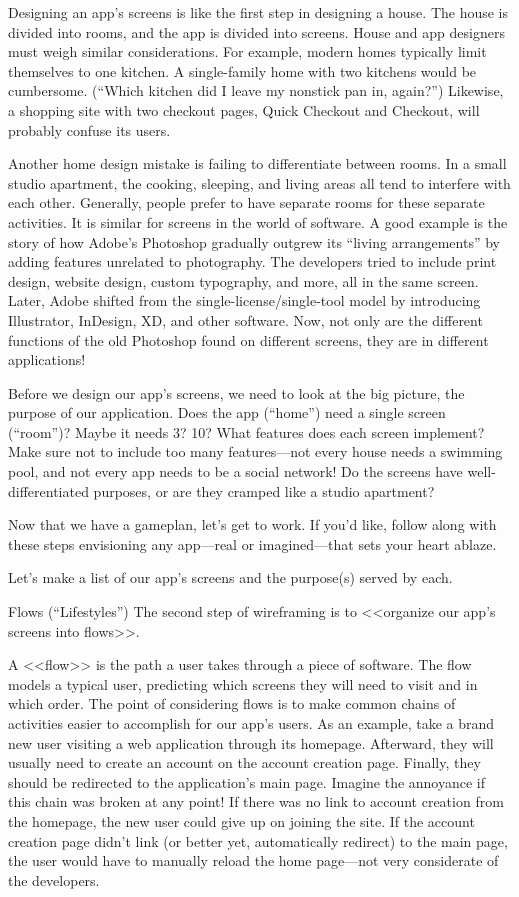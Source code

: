         Designing an app’s screens is like the first step in designing a house. The house is divided into rooms, and the app is divided into screens. House and app designers must weigh similar considerations. For example, modern homes typically limit themselves to one kitchen. A single-family home with two kitchens would be cumbersome. (“Which kitchen did I leave my nonstick pan in, again?”) Likewise, a shopping site with two checkout pages, Quick Checkout and Checkout, will probably confuse its users.

        Another home design mistake is failing to differentiate between rooms. In a small studio apartment, the cooking, sleeping, and living areas all tend to interfere with each other. Generally, people prefer to have separate rooms for these separate activities. It is similar for screens in the world of software. A good example is the story of how Adobe’s Photoshop gradually outgrew its “living arrangements” by adding features unrelated to photography. The developers tried to include print design, website design, custom typography, and more, all in the same screen. Later, Adobe shifted from the single-license/single-tool model by introducing Illustrator, InDesign, XD, and other software. Now, not only are the different functions of the old Photoshop found on different screens, they are in different applications!

        Before we design our app’s screens, we need to look at the big picture, the purpose of our application. Does the app (“home”) need a single screen (“room”)? Maybe it needs 3? 10? What features does each screen implement? Make sure not to include too many features—not every house needs a swimming pool, and not every app needs to be a social network! Do the screens have well-differentiated purposes, or are they cramped like a studio apartment?

        Now that we have a gameplan, let’s get to work. If you’d like, follow along with these steps envisioning any app—real or imagined—that sets your heart ablaze.

        Let’s make a list of our app’s screens and the purpose(s) served by each.

    Flows (“Lifestyles”)
        The second step of wireframing is to <<organize our app’s screens into flows>>.

        A <<flow>> is the path a user takes through a piece of software. The flow models a typical user, predicting which screens they will need to visit and in which order. The point of considering flows is to make common chains of activities easier to accomplish for our app’s users. As an example, take a brand new user visiting a web application through its homepage. Afterward, they will usually need to create an account on the account creation page. Finally, they should be redirected to the application’s main page. Imagine the annoyance if this chain was broken at any point! If there was no link to account creation from the homepage, the new user could give up on joining the site. If the account creation page didn’t link (or better yet, automatically redirect) to the main page, the user would have to manually reload the home page—not very considerate of the developers.

